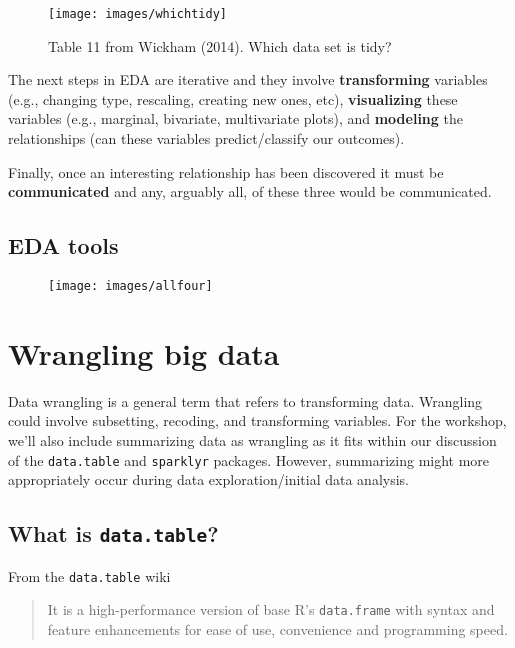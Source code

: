 \documentclass[]{book}
\begin{document}
\begin{figure}
\texttt{[image: images/whichtidy]} \caption{Table 11 from Wickham (2014). Which data set is tidy?}\label{fig:tidypic}
\end{figure}

The next steps in EDA are iterative and they involve \textbf{transforming} variables (e.g., changing type, rescaling, creating new ones, etc), \textbf{visualizing} these variables (e.g., marginal, bivariate, multivariate plots), and \textbf{modeling} the relationships (can these variables predict/classify our outcomes).

Finally, once an interesting relationship has been discovered it must be \textbf{communicated} and any, arguably all, of these three would be communicated.

\hypertarget{eda-tools}{%
\section{EDA tools}\label{eda-tools}}

\begin{figure}
\texttt{[image: images/allfour]} \end{figure}

\hypertarget{wrangling-big-data}{%
\chapter{Wrangling big data}\label{wrangling-big-data}}

Data wrangling is a general term that refers to transforming data. Wrangling could involve subsetting, recoding, and transforming variables. For the workshop, we'll also include summarizing data as wrangling as it fits within our discussion of the \texttt{data.table} and \texttt{sparklyr} packages. However, summarizing might more appropriately occur during data exploration/initial data analysis.

\hypertarget{what-is-data.table}{%
\section{\texorpdfstring{What is \texttt{data.table}?}{What is data.table?}}\label{what-is-data.table}}

From the \texttt{data.table} wiki

\begin{quote}
It is a high-performance version of base R's \texttt{data.frame} with syntax and feature enhancements for ease of use, convenience and programming speed.
\end{quote}
\end{document}
